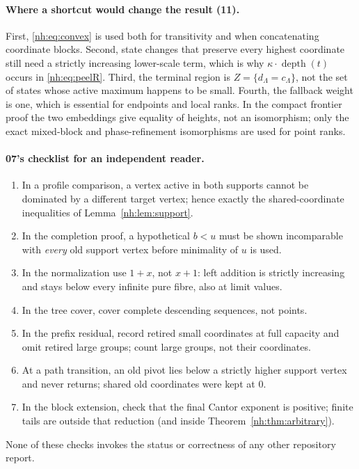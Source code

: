 \documentclass[11pt,a4paper]{article}
\theoremstyle{definition}
\theoremstyle{remark}
\DeclareMathOperator{\depth}{depth}
\begin{document}
\paragraph{Where a shortcut would change the result (11).} First,
\eqref{nh:eq:convex} is used both for transitivity and when concatenating
coordinate blocks. Second, state changes that preserve every highest coordinate
still need a strictly increasing lower-scale term, which is why
$\kappa\cdot\depth(t)$ occurs in \eqref{nh:eq:peelR}. Third, the terminal region
is $Z=\{d_\Lambda=c_\Lambda\}$, not the set of states whose active maximum happens
to be small. Fourth, the fallback weight is one, which is essential for
endpoints and local ranks. In the compact frontier proof the two embeddings give
equality of heights, not an isomorphism; only the exact mixed-block and
phase-refinement isomorphisms are used for point ranks.

\paragraph{07's checklist for an independent reader.}
\begin{enumerate}[label=(\arabic*)]
\item In a profile comparison, a vertex active in both supports cannot be
dominated by a different target vertex; hence exactly the shared-coordinate
inequalities of Lemma~\ref{nh:lem:support}.
\item In the completion proof, a hypothetical $b<u$ must be shown incomparable
with \emph{every} old support vertex before minimality of $u$ is used.
\item In the normalization use $1+x$, not $x+1$: left addition is strictly
increasing and stays below every infinite pure fibre, also at limit values.
\item In the tree cover, cover complete descending sequences, not points.
\item In the prefix residual, record retired small coordinates at full capacity
and omit retired large groups; count large groups, not their coordinates.
\item At a path transition, an old pivot lies below a strictly higher support
vertex and never returns; shared old coordinates were kept at $0$.
\item In the block extension, check that the final Cantor exponent is positive;
finite tails are outside that reduction (and inside
Theorem~\ref{nh:thm:arbitrary}).
\end{enumerate}
None of these checks invokes the status or correctness of any other repository
report.
\end{document}

